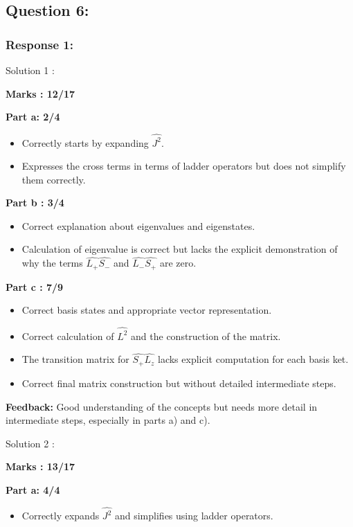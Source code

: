\documentclass[a4paper,11pt]{article}
\begin{document}
\subsection*{Question 6:}

\subsubsection*{Response 1:}

Solution 1 :

\textbf{Marks : 12/17}

\textbf{Part a: 2/4}
\begin{itemize}
    \item Correctly starts by expanding $\hat{J^2}$.
    \item Expresses the cross terms in terms of ladder operators but does not simplify them correctly.
\end{itemize}

\textbf{Part b : 3/4}
\begin{itemize}
    \item Correct explanation about eigenvalues and eigenstates.
    \item Calculation of eigenvalue is correct but lacks the explicit demonstration of why the terms $\hat{L_+}\hat{S_-}$ and $\hat{L_-}\hat{S_+}$ are zero.
\end{itemize}

\textbf{Part c : 7/9}
\begin{itemize}
    \item Correct basis states and appropriate vector representation.
    \item Correct calculation of $\hat{L^2}$ and the construction of the matrix.
    \item The transition matrix for $\hat{S_+}\hat{L_z}$ lacks explicit computation for each basis ket.
    \item Correct final matrix construction but without detailed intermediate steps.
\end{itemize}

\textbf{Feedback:}
Good understanding of the concepts but needs more detail in intermediate steps, especially in parts a) and c).


Solution 2 :

\textbf{Marks : 13/17}

\textbf{Part a: 4/4}
\begin{itemize}
    \item Correctly expands $\hat{J^2}$ and simplifies using ladder operators.
\end{itemize}
\end{document}
